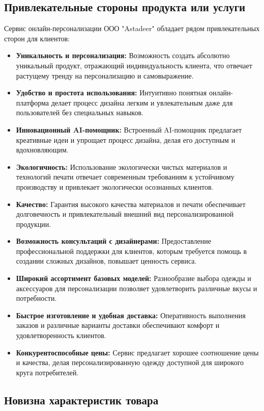 \subsection{Привлекательные стороны продукта или услуги}

Сервис онлайн-персонализации ООО "Astadeer" обладает рядом привлекательных сторон для клиентов:

\begin{itemize}
    \item \textbf{Уникальность и персонализация:}  Возможность создать абсолютно уникальный продукт, отражающий индивидуальность клиента, что отвечает растущему тренду на персонализацию и самовыражение.
    \item \textbf{Удобство и простота использования:}  Интуитивно понятная онлайн-платформа делает процесс дизайна легким и увлекательным даже для пользователей без специальных навыков.
    \item \textbf{Инновационный AI-помощник:}  Встроенный AI-помощник предлагает креативные идеи и упрощает процесс дизайна, делая его доступным и вдохновляющим.
    \item \textbf{Экологичность:}  Использование экологически чистых материалов и технологий печати отвечает современным требованиям к устойчивому производству и привлекает экологически осознанных клиентов.
    \item \textbf{Качество:}  Гарантия высокого качества материалов и печати обеспечивает долговечность и привлекательный внешний вид персонализированной продукции.
    \item \textbf{Возможность консультаций с дизайнерами:}  Предоставление профессиональной поддержки для клиентов, которым требуется помощь в создании сложных дизайнов, повышает ценность сервиса.
    \item \textbf{Широкий ассортимент базовых моделей:}  Разнообразие выбора одежды и аксессуаров для персонализации позволяет удовлетворить различные вкусы и потребности.
    \item \textbf{Быстрое изготовление и удобная доставка:}  Оперативность выполнения заказов и различные варианты доставки обеспечивают комфорт и удовлетворенность клиентов.
    \item \textbf{Конкурентоспособные цены:}  Сервис предлагает хорошее соотношение цены и качества, делая персонализированную одежду доступной для широкого круга потребителей.
\end{itemize}

\subsection{Новизна характеристик товара}

